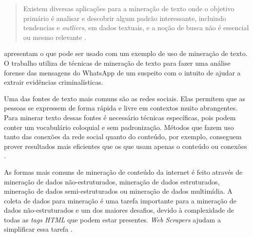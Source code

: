 \begin{quote}
    Existem diversas aplicações para a mineração de texto onde o objetivo primário é analisar e descobrir algum padrão interessante, incluindo tendencias e \textit{outliers}, em dados textuais, e a noção de busca não é essencial ou mesmo relevante \cite[p.~2, tradução nossa]{aggarwal2012mining}.
\end{quote}

 apresentam o que pode ser usado com um exemplo de uso de mineração de texto. O trabalho utiliza de técnicas de mineração de texto para fazer uma análise forense das mensagens do WhatsApp de um suspeito com o intuito de ajudar a extrair evidências criminalísticas.


Uma das fontes de texto mais comuns são as redes sociais. Elas permitem que as pessoas se expressem de forma rápida e livre em contextos muito abrangentes. Para minerar texto dessas fontes é necessário técnicas específicas, pois podem conter um vocabulário coloquial e sem padronização. Métodos que fazem uso tanto das conexões da rede social quanto do conteúdo, por exemplo, conseguem prover resultados mais eficientes que os que usam apenas o conteúdo ou conexões \cite{aggarwal2012mining}. 

As formas mais comuns de mineração de conteúdo da internet é feito através de mineração de dados não-estruturados, mineração de dados estruturados, mineração de dados semi-estruturados ou mineração de dados multimídia. A coleta de dados para mineração é uma tarefa importante para a mineração de dados não-estruturados e um dos maiores desafios, devido à complexidade de todas as \textit{tags} \textit{HTML} que podem estar presentes. \textit{Web Scrapers} ajudam a simplificar essa tarefa \cite{dastidar2016intelligent}.



